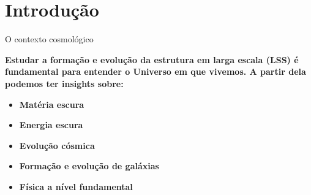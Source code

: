 \section{Introdução}



\begin{frame}[c]{O contexto cosmológico}
    \begin{splusbox}{}
        \textbf{Estudar a formação e evolução da estrutura em larga escala (LSS) é fundamental para entender o Universo em que vivemos. A partir dela podemos ter insights sobre:}
        \begin{itemize}
            \item \textbf{Matéria escura}
            \item \textbf{Energia escura}
            \item \textbf{Evolução cósmica}
            \item \textbf{Formação e evolução de galáxias}
            \item \textbf{Física a nível fundamental}
        \end{itemize}
    \end{splusbox}
\end{frame}

